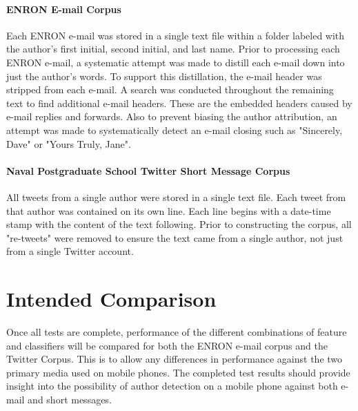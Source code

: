 	\paragraph{ENRON E-mail Corpus} Each ENRON e-mail was stored in a single text file within a folder labeled with the author's first initial, second initial, and last name.  Prior to processing each ENRON e-mail, a systematic attempt was made to distill each e-mail down into just the author's words.  To support this distillation, the e-mail header was stripped from each e-mail.  A search was conducted throughout the remaining text to find additional e-mail headers.  These are the embedded headers caused by e-mail replies and forwards.  Also to prevent biasing the author attribution, an attempt was made to systematically detect an e-mail closing such as "Sincerely, Dave" or "Yours Truly, Jane".
	\paragraph{Naval Postgraduate School Twitter Short Message Corpus} All tweets from a single author were stored in a single text file.  Each tweet from that author was contained on its own line.  Each line begins with a date-time stamp with the content of the text following.  Prior to constructing the corpus, all "re-tweets" were removed to ensure the text came from a single author, not just from a single Twitter account.
	
\section{Intended Comparison}  Once all tests are complete, performance of the different combinations of feature and classifiers will be compared for both the ENRON e-mail corpus and the Twitter Corpus.  This is to allow any differences in performance against the two primary media used on mobile phones.  The completed test results should provide insight into the possibility of author detection on a mobile phone against both e-mail and short messages.




